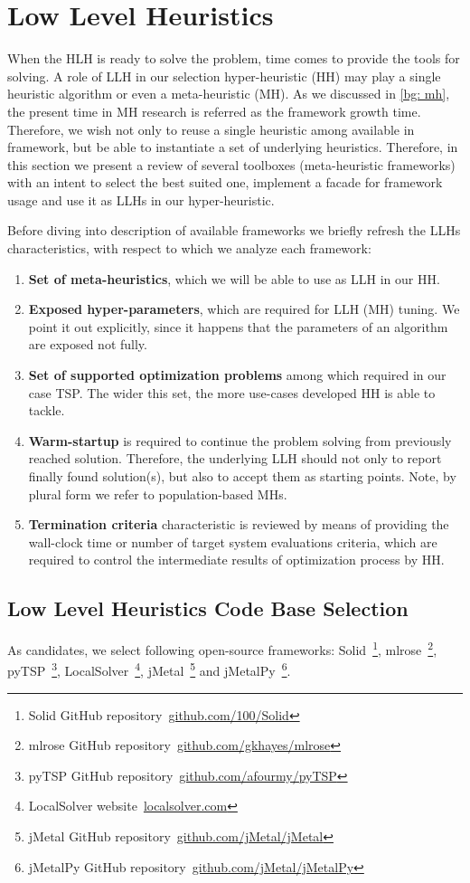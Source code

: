 \section{Low Level Heuristics}\label{impl: LLH}
When the HLH is ready to solve the problem, time comes to provide the tools for solving. A role of LLH in our selection hyper-heuristic (HH) may play a single heuristic algorithm or even a meta-heuristic (MH). As we discussed in \cref{bg: mh}, the present time in MH research is referred as the framework growth time. Therefore, we wish not only to reuse a single heuristic among available in framework, but be able to instantiate a set of underlying heuristics. Therefore, in this section we present a review of several toolboxes (meta-heuristic frameworks) with an intent to select the best suited one, implement a facade for framework usage and use it as LLHs in our hyper-heuristic.

Before diving into description of available frameworks we briefly refresh the LLHs characteristics, with respect to which we analyze each framework:
\begin{enumerate}
	\item \textbf{Set of meta-heuristics}, which we will be able to use as LLH in our HH.
	
	\item \textbf{Exposed hyper-parameters}, which are required for LLH (MH) tuning. We point it out explicitly, since it happens that the parameters of an algorithm are exposed not fully.
	
	\item \textbf{Set of supported optimization problems} among which required in our case TSP. The wider this set, the more use-cases developed HH is able to tackle.
	
	\item \textbf{Warm-startup} is required to continue the problem solving from previously reached solution. Therefore, the underlying LLH should not only to report finally found solution(s), but also to accept them as starting points. Note, by plural form we refer to population-based MHs.
	
	\item \textbf{Termination criteria} characteristic is reviewed by means of providing the wall-clock time or number of target system evaluations criteria, which are required to control the intermediate results of optimization process by HH.
\end{enumerate}


\subsection{Low Level Heuristics Code Base Selection}\label{implementation:llh code basis selection}
As candidates, we select following open-source frameworks: Solid~\footnote{Solid GitHub repository~\url{github.com/100/Solid}}, mlrose~\footnote{mlrose GitHub repository~\url{github.com/gkhayes/mlrose}}, pyTSP~\footnote{pyTSP GitHub repository~\url{github.com/afourmy/pyTSP}}, LocalSolver~\footnote{LocalSolver website~\url{localsolver.com}}, jMetal~\footnote{jMetal GitHub repository~\url{github.com/jMetal/jMetal}} and jMetalPy~\footnote{jMetalPy GitHub repository~\url{github.com/jMetal/jMetalPy}}.

